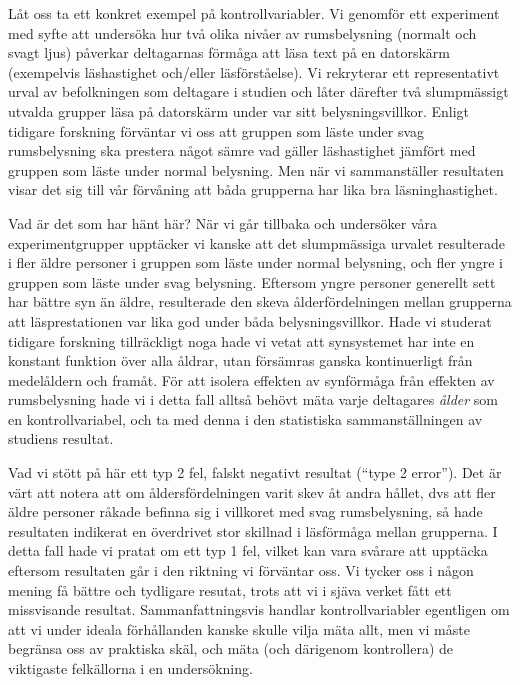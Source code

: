 \documentclass[
]{book}
\begin{document}
Låt oss ta ett konkret exempel på kontrollvariabler. Vi genomför ett experiment med syfte att undersöka hur två olika nivåer av rumsbelysning (normalt och svagt ljus) påverkar deltagarnas förmåga att läsa text på en datorskärm (exempelvis läshastighet och/eller läsförståelse). Vi rekryterar ett representativt urval av befolkningen som deltagare i studien och låter därefter två slumpmässigt utvalda grupper läsa på datorskärm under var sitt belysningsvillkor. Enligt tidigare forskning förväntar vi oss att gruppen som läste under svag rumsbelysning ska prestera något sämre vad gäller läshastighet jämfört med gruppen som läste under normal belysning. Men när vi sammanställer resultaten visar det sig till vår förvåning att båda grupperna har lika bra läsninghastighet.

Vad är det som har hänt här? När vi går tillbaka och undersöker våra experimentgrupper upptäcker vi kanske att det slumpmässiga urvalet resulterade i fler äldre personer i gruppen som läste under normal belysning, och fler yngre i gruppen som läste under svag belysning. Eftersom yngre personer generellt sett har bättre syn än äldre, resulterade den skeva ålderfördelningen mellan grupperna att läsprestationen var lika god under båda belysningsvillkor. Hade vi studerat tidigare forskning tillräckligt noga hade vi vetat att synsystemet har inte en konstant funktion över alla åldrar, utan försämras ganska kontinuerligt från medelåldern och framåt. För att isolera effekten av synförmåga från effekten av rumsbelysning hade vi i detta fall alltså behövt mäta varje deltagares \emph{ålder} som en kontrollvariabel, och ta med denna i den statistiska sammanställningen av studiens resultat.

Vad vi stött på här ett typ 2 fel, falskt negativt resultat (``type 2 error''). Det är värt att notera att om åldersfördelningen varit skev åt andra hållet, dvs att fler äldre personer råkade befinna sig i villkoret med svag rumsbelysning, så hade resultaten indikerat en överdrivet stor skillnad i läsförmåga mellan grupperna. I detta fall hade vi pratat om ett typ 1 fel, vilket kan vara svårare att upptäcka eftersom resultaten går i den riktning vi förväntar oss. Vi tycker oss i någon mening få bättre och tydligare resutat, trots att vi i sjäva verket fått ett missvisande resultat. Sammanfattningsvis handlar kontrollvariabler egentligen om att vi under ideala förhållanden kanske skulle vilja mäta allt, men vi måste begränsa oss av praktiska skäl, och mäta (och därigenom kontrollera) de viktigaste felkällorna i en undersökning.
\end{document}
